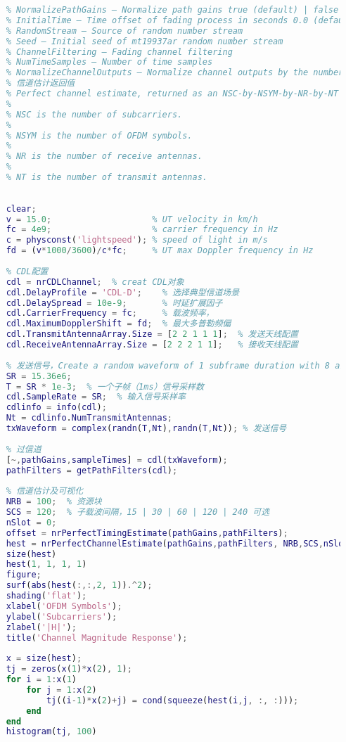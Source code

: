 \begin{lstlisting}[language={matlab}]
    % SampleDensity — Number of time samples per half wavelength 64 (default) | Inf | numeric scalar
    % NormalizePathGains — Normalize path gains true (default) | false
    % InitialTime — Time offset of fading process in seconds 0.0 (default) | numeric scalar
    % RandomStream — Source of random number stream
    % Seed — Initial seed of mt19937ar random number stream
    % ChannelFiltering — Fading channel filtering
    % NumTimeSamples — Number of time samples
    % NormalizeChannelOutputs — Normalize channel outputs by the number of receive antennas
    % 信道估计返回值
    % Perfect channel estimate, returned as an NSC-by-NSYM-by-NR-by-NT complex array, where:
    % 
    % NSC is the number of subcarriers.
    % 
    % NSYM is the number of OFDM symbols.
    % 
    % NR is the number of receive antennas.
    % 
    % NT is the number of transmit antennas.
    
    
    clear;
    v = 15.0;                    % UT velocity in km/h
    fc = 4e9;                    % carrier frequency in Hz
    c = physconst('lightspeed'); % speed of light in m/s
    fd = (v*1000/3600)/c*fc;     % UT max Doppler frequency in Hz
    
    % CDL配置
    cdl = nrCDLChannel;  % creat CDL对象
    cdl.DelayProfile = 'CDL-D';    % 选择典型信道场景
    cdl.DelaySpread = 10e-9;       % 时延扩展因子
    cdl.CarrierFrequency = fc;     % 载波频率，
    cdl.MaximumDopplerShift = fd;  % 最大多普勒频偏
    cdl.TransmitAntennaArray.Size = [2 2 1 1 1];  % 发送天线配置
    cdl.ReceiveAntennaArray.Size = [2 2 2 1 1];   % 接收天线配置
    
    % 发送信号，Create a random waveform of 1 subframe duration with 8 antennas.
    SR = 15.36e6;  
    T = SR * 1e-3;  % 一个子帧（1ms）信号采样数
    cdl.SampleRate = SR;  % 输入信号采样率
    cdlinfo = info(cdl);
    Nt = cdlinfo.NumTransmitAntennas;
    txWaveform = complex(randn(T,Nt),randn(T,Nt)); % 发送信号
    
    % 过信道
    [~,pathGains,sampleTimes] = cdl(txWaveform);
    pathFilters = getPathFilters(cdl);
    
    % 信道估计及可视化
    NRB = 100;  % 资源块
    SCS = 120;  % 子载波间隔，15 | 30 | 60 | 120 | 240 可选
    nSlot = 0;
    offset = nrPerfectTimingEstimate(pathGains,pathFilters);
    hest = nrPerfectChannelEstimate(pathGains,pathFilters, NRB,SCS,nSlot,offset,sampleTimes);
    size(hest)
    hest(1, 1, 1, 1)
    figure;
    surf(abs(hest(:,:,2, 1)).^2);
    shading('flat');
    xlabel('OFDM Symbols');
    ylabel('Subcarriers');
    zlabel('|H|');
    title('Channel Magnitude Response');
    
    x = size(hest);
    tj = zeros(x(1)*x(2), 1);
    for i = 1:x(1)
        for j = 1:x(2)
            tj((i-1)*x(2)+j) = cond(squeeze(hest(i,j, :, :)));
        end
    end
    histogram(tj, 100)    
\end{lstlisting}